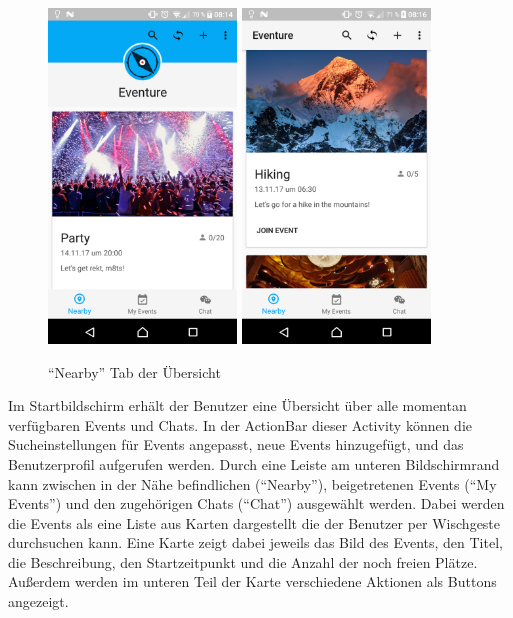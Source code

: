 \documentclass{scrartcl}
\begin{document}
\begin{figure}[h!tbp]
  \centering
  \includegraphics[width=5cm]{img/overview_nearby_1}
  \hspace{1cm}
  \includegraphics[width=5cm]{img/overview_nearby_2}
  \caption{\enquote{Nearby} Tab der Übersicht}
\end{figure}

Im Startbildschirm erhält der Benutzer eine Übersicht über alle momentan
verfügbaren Events und Chats. In der ActionBar dieser Activity können die
Sucheinstellungen für Events angepasst, neue Events hinzugefügt, und das
Benutzerprofil aufgerufen werden. Durch eine Leiste am unteren Bildschirmrand
kann zwischen in der Nähe befindlichen (\enquote{Nearby}), beigetretenen
Events (\enquote{My Events}) und den zugehörigen Chats (\enquote{Chat})
ausgewählt werden. Dabei werden die Events als eine Liste aus Karten dargestellt
die der Benutzer per Wischgeste durchsuchen kann. Eine Karte zeigt dabei jeweils
das Bild des Events, den Titel, die Beschreibung, den Startzeitpunkt und die
Anzahl der noch freien Plätze. Außerdem werden im unteren Teil der Karte
verschiedene Aktionen als Buttons angezeigt.
\end{document}
